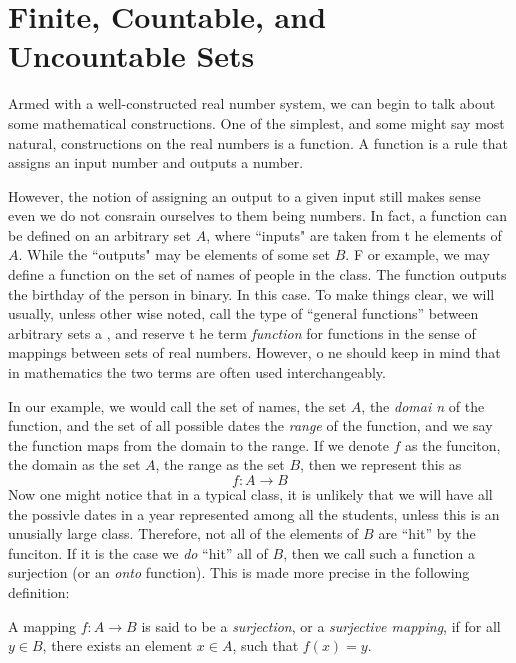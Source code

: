 \documentclass[../../templates/section]{subfiles}
\begin{document}
\section{Finite, Countable, and Uncountable Sets}\label{sec:finite-countable-and-uncountable-sets}

Armed with a well-constructed real number system, we can begin to talk about
some mathematical constructions. One of the simplest, and some might say most 
natural, constructions on the real numbers is a function. A function
is a rule that assigns an input number and outputs a number. 

However, the notion of assigning an output to a given input still makes sense 
even we do not consrain ourselves to them being numbers. In fact, a 
function can be defined on an arbitrary set $A$, where ``inputs" are taken from t
he elements of $A$. While the ``outputs" may be elements of some set $B$. F
or example, we may define a function on the set
of names of people in the class. The function outputs the birthday of the person in
binary. In this case. To make things clear, we will usually, unless other
wise noted, call the type of 
``general functions'' between arbitrary sets a , and reserve t
he term \emph{function} for 
functions in the sense of mappings between sets of real numbers. However, o
ne should keep in mind that
in mathematics the two terms are often used interchangeably.

In our example, we would call the set of names, the set $A$, the \emph{domai
n} of the function, and
the set of all possible dates the \emph{range} of the function, and we say the
function maps from the domain to the range. If we denote $f$ as the funciton,
the domain as the set $A$, the range as the set $B$, then we represent this as
\[
f:A\to B
\]
Now one might notice that in a typical class, it is unlikely that we will
have all the possivle dates in a year represented among all the students,
unless this is an unusially large class.
Therefore, not all of the elements of $B$ are ``hit'' by the funciton. If it is
the case we \emph{do} ``hit'' all of $B$, then we call such a function a surjection
(or an \emph{onto} function). This is made more precise in the following definition:

\begin{definition}
A mapping $f:A\to B$ is said to be a \emph{surjection}, or a \emph{surjective
mapping}, if for all $y\in B$, there exists an element $x\in A$, such that
$f(x) = y$.
\end{definition}
\end{document}
